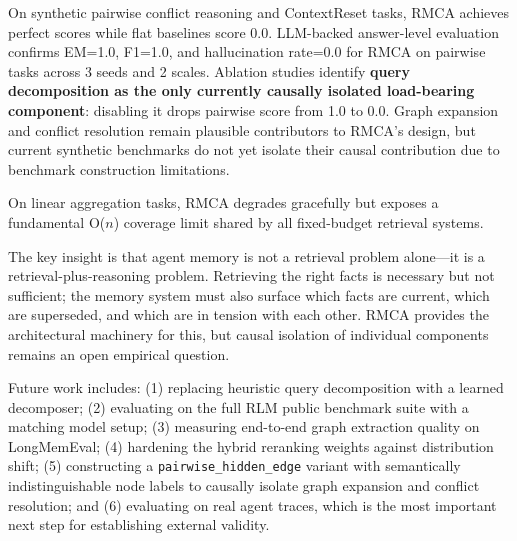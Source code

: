 \documentclass[conference]{IEEEtran}
\begin{document}
On synthetic pairwise conflict reasoning and ContextReset tasks, RMCA achieves perfect
scores while flat baselines score 0.0. LLM-backed answer-level evaluation confirms
EM=1.0, F1=1.0, and hallucination rate=0.0 for RMCA on pairwise tasks across 3 seeds
and 2 scales. Ablation studies identify \textbf{query decomposition as the only currently
causally isolated load-bearing component}: disabling it drops pairwise score from 1.0 to 0.0.
Graph expansion and conflict resolution remain plausible contributors to RMCA's design,
but current synthetic benchmarks do not yet isolate their causal contribution due to
benchmark construction limitations.

On linear aggregation tasks, RMCA degrades gracefully but exposes a fundamental O($n$)
coverage limit shared by all fixed-budget retrieval systems.

The key insight is that agent memory is not a retrieval problem alone---it is a
retrieval-plus-reasoning problem. Retrieving the right facts is necessary but not sufficient;
the memory system must also surface which facts are current, which are superseded, and which
are in tension with each other. RMCA provides the architectural machinery for this, but
causal isolation of individual components remains an open empirical question.

Future work includes: (1) replacing heuristic query decomposition with a learned decomposer;
(2) evaluating on the full RLM public benchmark suite with a matching model setup;
(3) measuring end-to-end graph extraction quality on LongMemEval;
(4) hardening the hybrid reranking weights against distribution shift;
(5) constructing a \texttt{pairwise\_hidden\_edge} variant with semantically indistinguishable
node labels to causally isolate graph expansion and conflict resolution; and
(6) evaluating on real agent traces, which is the most important next step for
establishing external validity.
\end{document}
